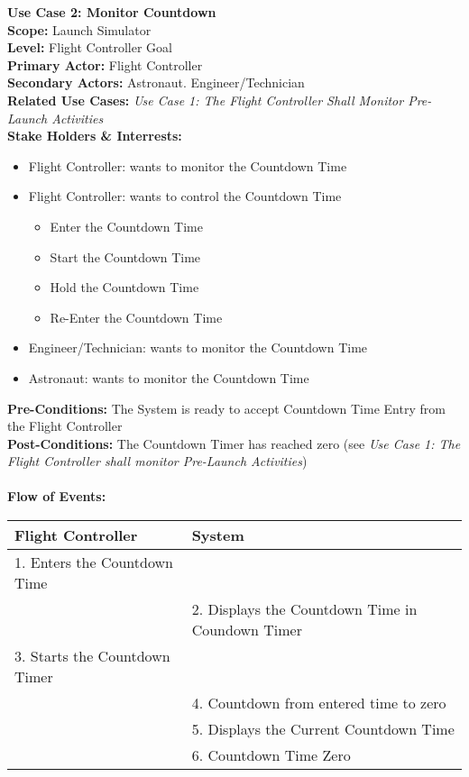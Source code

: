 \documentclass[letterpaper]{article}
\begin{document}
\noindent
\textbf{Use Case 2:  Monitor Countdown}\\
\textbf{Scope:  }Launch Simulator\\
\textbf{Level:  }Flight Controller Goal\\
\textbf{Primary Actor:  }Flight Controller\\
\textbf{Secondary Actors:  }Astronaut. Engineer/Technician\\
\textbf{Related Use Cases:  }\textit{Use Case 1:  The Flight Controller
Shall Monitor Pre-Launch Activities}\\
\textbf{Stake Holders \& Interrests:  }
\begin{itemize}
\item Flight Controller:  wants to monitor the Countdown Time
\item Flight Controller:  wants to control the Countdown Time
\begin{itemize}
\item Enter the Countdown Time
\item Start the Countdown Time
\item Hold the Countdown Time
\item Re-Enter the Countdown Time
\end{itemize}
\item Engineer/Technician:  wants to monitor the Countdown Time
\item Astronaut:  wants to monitor the Countdown Time
\end{itemize}
\textbf{Pre-Conditions:  }The System is ready to accept Countdown Time
Entry from the Flight Controller\\
\textbf{Post-Conditions:  }The Countdown Timer has reached zero (see
\textit{Use Case 1:  The Flight Controller shall monitor Pre-Launch
Activities})\\\\
\textbf{Flow of Events:}\\
\begin{tabular}{|p{5.75cm}|p{5.75cm}|}\hline
\textbf{Flight Controller}&\textbf{System}\\\hline
1. Enters the Countdown Time&\\\hline
& 2. Displays the Countdown Time in Coundown Timer\\\hline
3.  Starts the Countdown Timer &\\\hline
& 4. Countdown from entered time to zero\\\hline
& 5. Displays the Current Countdown Time\\\hline
& 6. Countdown Time Zero\\\hline
\end{tabular}\\\\
\end{document}
